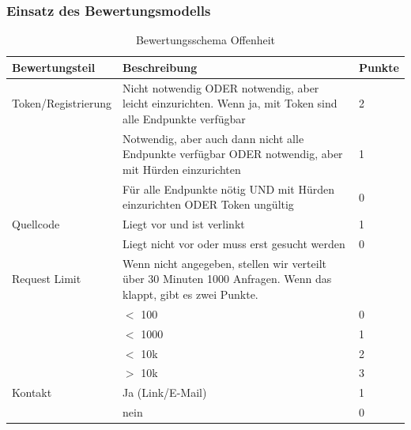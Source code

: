 \documentclass[notitlepage, hidelinks]{article}
\begin{document}
\subsubsection{Einsatz des Bewertungsmodells}

\begin{table}[H]
\begin{center}
\begin{tabular}{|p{3.6cm}|p{8.5cm}|p{2.5cm}|}
\hline
\textbf{Bewertungsteil} & \textbf{Beschreibung} & \textbf{Punkte}\\ \hline
Token/Registrierung & Nicht notwendig ODER notwendig, aber leicht einzurichten. Wenn ja, mit Token sind alle Endpunkte verfügbar & 2\\ \hline
& Notwendig, aber auch dann nicht alle Endpunkte verfügbar ODER notwendig, aber mit Hürden einzurichten & 1\\ \hline
& Für alle Endpunkte nötig UND mit Hürden einzurichten ODER Token ungültig & 0\\ \hline
Quellcode & Liegt vor und ist verlinkt & 1\\ \hline
& Liegt nicht vor oder muss erst gesucht werden & 0\\ \hline
Request Limit & Wenn nicht angegeben, stellen wir verteilt über 30 Minuten 1000 Anfragen. Wenn das klappt, gibt es zwei Punkte. & \\ \hline
& $<$ 100 & 0 \\ \hline
& $<$ 1000 & 1 \\ \hline
& $<$ 10k & 2 \\ \hline
& $>$ 10k & 3 \\ \hline
Kontakt & Ja (Link/E-Mail) & 1 \\ \hline
& nein & 0 \\ \hline
\end{tabular}
\caption{Bewertungsschema Offenheit}
\label{Offenheit}
\end{center}
\end{table}
\end{document}
